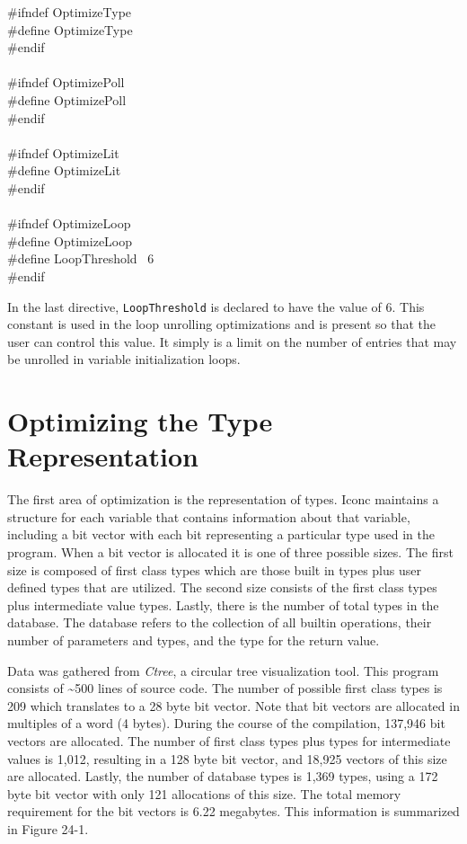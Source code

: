 \goodbreak
\begin{iconcode}
\#ifndef OptimizeType\\
\#define OptimizeType\\
\#endif\\
\\
\#ifndef OptimizePoll\\
\#define OptimizePoll\\
\#endif\\
\\
\#ifndef OptimizeLit\\
\#define OptimizeLit\\
\#endif\\
\\
\#ifndef OptimizeLoop\\
\#define OptimizeLoop\\
\#define LoopThreshold \ 6\\
\#endif\\
\end{iconcode}


In the last directive, \texttt{LoopThreshold} is declared to have the
value of 6. This constant is used in the loop unrolling optimizations
and is present so that the user can control this value. It simply is a
limit on the number of entries that may be unrolled in variable
initialization loops.


\section{Optimizing the Type Representation}

The first area of optimization is the representation of types. Iconc
maintains a structure for each variable that contains information
about that variable, including a bit vector with each bit representing
a particular type used in the program. When a bit vector is allocated
it is one of three possible sizes. The first size is composed of first
class types which are those built in types plus user defined types
that are utilized. The second size consists of the first class types
plus intermediate value types. Lastly, there is the number of total
types in the database. The database refers to the collection of all
builtin operations, their number of parameters and types, and the type
for the return value.

Data was gathered from \textit{Ctree}, a circular tree visualization
tool. This program consists of \~{}500 lines of source code. The
number of possible first class types is 209 which translates to a 28
byte bit vector. Note that bit vectors are allocated in multiples of a
word (4 bytes). During the course of the compilation, 137,946 bit
vectors are allocated. The number of first class types plus types for
intermediate values is 1,012, resulting in a 128 byte bit vector, and
18,925 vectors of this size are allocated. Lastly, the number of
database types is 1,369 types, using a 172 byte bit vector with only
121 allocations of this size. The total memory requirement for the bit
vectors is 6.22 megabytes. This information is summarized in Figure
24-1.


